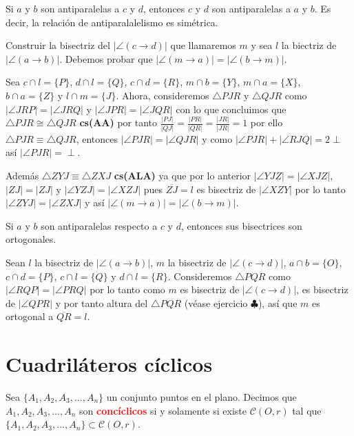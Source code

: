 \begin{prop}
Si $a$ y $b$ son antiparalelas a $c$ y $d$, entonces $c$ y $d$ son antiparalelas a $a$ y $b$. Es decir, la relación de antiparalalelismo es simétrica.
\end{prop}
\begin{pba}
Construir la bisectriz del $|\angle(c\longrightarrow d)|$ que llamaremos $m$ y sea $l$ la biectriz de $|\angle(a\longrightarrow b)|$.
Debemos probar que $|\angle(m\longrightarrow a)|=|\angle(b\longrightarrow m)|$.

Sea $c\cap l=\{P\}$, $d\cap l=\{Q\}$, $c\cap d=\{R\}$, $m\cap b=\{Y\}$, $m\cap a=\{X\}$, $b\cap a=\{Z\}$ y $l\cap m=\{J\}$. Ahora, consideremos $\triangle PJR$ y $\triangle QJR$ como $|\angle JRP|=|\angle JRQ|$ y $|\angle JPR|=|\angle JQR|$ con lo que concluimos que $\triangle PJR\cong\triangle QJR$ \textbf{cs(AA)} por tanto $\frac{|PJ|}{|QJ|}=\frac{|PR|}{|QR|}=\frac{|JR|}{|JR|}=1$ por   ello $\triangle PJR\equiv\triangle QJR$, entonces $|\angle PJR|=|\angle QJR|$ y como $|\angle PJR|+|\angle RJQ|=2\perp$ así $|\angle PJR|=\perp$.

Además $\triangle ZYJ\equiv\triangle ZXJ$ \textbf{cs(ALA)} ya que por lo anterior $|\angle YJZ|=|\angle XJZ|$, $|ZJ|=|ZJ|$ y $|\angle YZJ|=|\angle XZJ|$ pues $\overline{ZJ}=l$ es bisectriz de $|\angle XZY|$ por lo tanto $|\angle ZYJ|=|\angle ZXJ|$ y así $|\angle(m\longrightarrow a)|=|\angle(b\longrightarrow m)|$.
\end{pba}

\begin{prop}
Si $a$ y $b$ son antiparalelas respecto a $c$ y $d$, entonces sus bisectrices son ortogonales. 
\end{prop}

\begin{pba}
Sean $l$ la bisectriz de $|\angle(a\longrightarrow b)|$, $m$ la bisectriz de $|\angle(c\longrightarrow d)|$, $a\cap b=\{O\}$, $c\cap d=\{P\}$, $c\cap l=\{Q\}$ y $d\cap l=\{R\}$.
Consideremos $\triangle PQR$ como $|\angle RQP|=|\angle PRQ|$ por lo tanto como $m$ es bisectriz de $|\angle(c\longrightarrow d)|$, es bisectriz de $|\angle QPR|$ y por tanto altura del $\triangle PQR$ (véase ejercicio $\clubsuit$), así que $m$ es ortogonal a $\overline{QR}=l$.
\end{pba}

\section{Cuadriláteros cíclicos}
\begin{df}
Sea $\{A_{1},A_{2},A_{3},...,A_{n}\}$ un conjunto puntos en el plano. Decimos que $A_{1},A_{2},A_{3},...,A_{n}$ son \textcolor{red}{\bf concíclicos} si y solamente si existe $\mathcal{C}(O,r)$ tal que $\{A_{1},A_{2},A_{3},...,A_{n}\}\subset\mathcal{C}(O,r)$.
\end{df}

